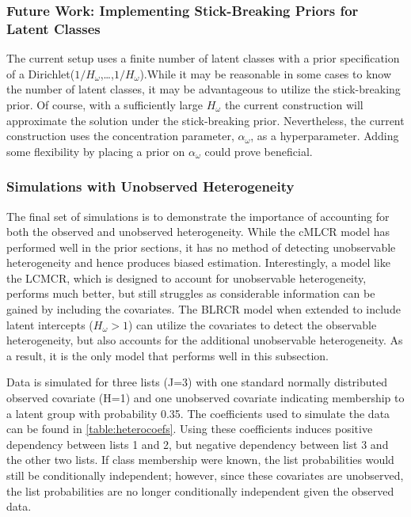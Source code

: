 \documentclass[
  12pt,
]{article}
\begin{document}
\subsubsection{Future Work: Implementing Stick-Breaking Priors for Latent Classes}

The current setup uses a finite number of latent classes with a prior
specification of a Dirichlet(\(1/H_\omega\),\ldots,\(1/H_\omega\)).While
it may be reasonable in some cases to know the number of latent classes,
it may be advantageous to utilize the stick-breaking prior. Of course,
with a sufficiently large \(H_\omega\) the current construction will
approximate the solution under the stick-breaking prior. Nevertheless,
the current construction uses the concentration parameter,
\(\alpha_\omega\), as a hyperparameter. Adding some flexibility by
placing a prior on \(\alpha_\omega\) could prove beneficial.

\subsubsection{Simulations with Unobserved Heterogeneity}
\label{Sec:simsunobservedheterogeneity}

The final set of simulations is to demonstrate the importance of
accounting for both the observed and unobserved heterogeneity. While the
cMLCR model has performed well in the prior sections, it has no method
of detecting unobservable heterogeneity and hence produces biased
estimation. Interestingly, a model like the LCMCR, which is designed to
account for unobservable heterogeneity, performs much better, but still
struggles as considerable information can be gained by including the
covariates. The BLRCR model when extended to include latent intercepts
(\(H_\omega>1\)) can utilize the covariates to detect the observable
heterogeneity, but also accounts for the additional unobservable
heterogeneity. As a result, it is the only model that performs well in
this subsection.

Data is simulated for three lists (J=3) with one standard normally
distributed observed covariate (H=1) and one unobserved covariate
indicating membership to a latent group with probability 0.35. The
coefficients used to simulate the data can be found in
\autoref{table:heterocoefs}. Using these coefficients induces positive
dependency between lists 1 and 2, but negative dependency between list 3
and the other two lists. If class membership were known, the list
probabilities would still be conditionally independent; however, since
these covariates are unobserved, the list probabilities are no longer
conditionally independent given the observed data.
\end{document}
